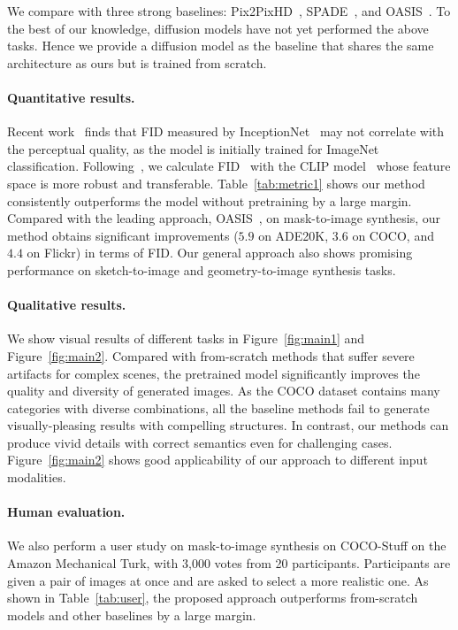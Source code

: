 We compare with three strong baselines: Pix2PixHD~\cite{wang2018high},  SPADE~\cite{park2019SPADE}, and OASIS~\cite{oasis}. To the best of our knowledge, diffusion models have not yet performed the above tasks. Hence we provide a diffusion model as the baseline that shares the same architecture as ours but is trained from scratch.

\paragraph{Quantitative results.} Recent work~\cite{kynkaanniemi2022role} finds that FID measured by InceptionNet~\cite{heusel2017gans} may not correlate with the perceptual quality, as the model is initially trained for ImageNet classification. Following~\cite{kynkaanniemi2022role},   we calculate FID~\cite{heusel2017gans} with the CLIP model~\cite{radford2021learning} whose feature space is more robust and transferable. Table~\ref{tab:metric1} shows our method consistently outperforms the model without pretraining by a large margin. Compared with the leading approach, OASIS~\cite{oasis}, on mask-to-image synthesis, our method obtains significant improvements ($5.9$ on ADE20K, $3.6$ on COCO, and $4.4$ on Flickr) in terms of FID. Our general approach also shows promising performance on sketch-to-image and geometry-to-image synthesis tasks. 

\paragraph{Qualitative results.} We show visual results of different tasks in Figure~\ref{fig:main1} and Figure~\ref{fig:main2}. Compared with from-scratch methods that suffer severe artifacts for complex scenes, the pretrained model significantly improves the quality and diversity of generated images. As the COCO dataset contains many categories with diverse combinations, all the baseline methods fail to generate visually-pleasing results with compelling structures. In contrast, our methods can produce vivid details with correct semantics even for challenging cases. Figure~\ref{fig:main2} shows good applicability of our approach to different input modalities. 

\paragraph{Human evaluation.} We also perform a user study on mask-to-image synthesis on COCO-Stuff on the Amazon Mechanical Turk,  with 3,000 votes from 20 participants. Participants are given a pair of images at once and are asked to select a more realistic one. As shown in Table~\ref{tab:user}, the proposed approach outperforms from-scratch models and other baselines by a large margin.

